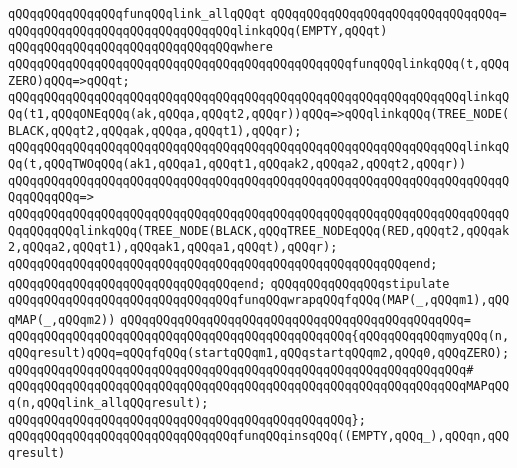 \verb|qQQqqQQqqQQqqQQqfunqQQqlink_allqQQqt|\newline
\verb|qQQqqQQqqQQqqQQqqQQqqQQqqQQqqQQq=|\newline
\verb|qQQqqQQqqQQqqQQqqQQqqQQqqQQqqQQqlinkqQQq(EMPTY,qQQqt)|\newline
\verb|qQQqqQQqqQQqqQQqqQQqqQQqqQQqqQQqwhere|\newline
\verb|qQQqqQQqqQQqqQQqqQQqqQQqqQQqqQQqqQQqqQQqqQQqqQQqfunqQQqlinkqQQq(t,qQQqZERO)qQQq=>qQQqt;|\newline
\verb|qQQqqQQqqQQqqQQqqQQqqQQqqQQqqQQqqQQqqQQqqQQqqQQqqQQqqQQqqQQqqQQqlinkqQQq(t1,qQQqONEqQQq(ak,qQQqa,qQQqt2,qQQqr))qQQq=>qQQqlinkqQQq(TREE_NODE(BLACK,qQQqt2,qQQqak,qQQqa,qQQqt1),qQQqr);|\newline
\newline
\verb|qQQqqQQqqQQqqQQqqQQqqQQqqQQqqQQqqQQqqQQqqQQqqQQqqQQqqQQqqQQqqQQqlinkqQQq(t,qQQqTWOqQQq(ak1,qQQqa1,qQQqt1,qQQqak2,qQQqa2,qQQqt2,qQQqr))|\newline
\verb|qQQqqQQqqQQqqQQqqQQqqQQqqQQqqQQqqQQqqQQqqQQqqQQqqQQqqQQqqQQqqQQqqQQqqQQqqQQqqQQq=>|\newline
\verb|qQQqqQQqqQQqqQQqqQQqqQQqqQQqqQQqqQQqqQQqqQQqqQQqqQQqqQQqqQQqqQQqqQQqqQQqqQQqqQQqlinkqQQq(TREE_NODE(BLACK,qQQqTREE_NODEqQQq(RED,qQQqt2,qQQqak2,qQQqa2,qQQqt1),qQQqak1,qQQqa1,qQQqt),qQQqr);|\newline
\verb|qQQqqQQqqQQqqQQqqQQqqQQqqQQqqQQqqQQqqQQqqQQqqQQqqQQqqQQqend;|\newline
\verb|qQQqqQQqqQQqqQQqqQQqqQQqqQQqqQQqend;|\newline
\newline
\verb|qQQqqQQqqQQqqQQqstipulate|\newline
\verb|qQQqqQQqqQQqqQQqqQQqqQQqqQQqqQQqfunqQQqwrapqQQqfqQQq(MAP(_,qQQqm1),qQQqMAP(_,qQQqm2))|\newline
\verb|qQQqqQQqqQQqqQQqqQQqqQQqqQQqqQQqqQQqqQQqqQQqqQQq=|\newline
\verb|qQQqqQQqqQQqqQQqqQQqqQQqqQQqqQQqqQQqqQQqqQQqqQQq{qQQqqQQqqQQqmyqQQq(n,qQQqresult)qQQq=qQQqfqQQq(startqQQqm1,qQQqstartqQQqm2,qQQq0,qQQqZERO);|\newline
\verb|qQQqqQQqqQQqqQQqqQQqqQQqqQQqqQQqqQQqqQQqqQQqqQQqqQQqqQQqqQQqqQQq#|\newline
\verb|qQQqqQQqqQQqqQQqqQQqqQQqqQQqqQQqqQQqqQQqqQQqqQQqqQQqqQQqqQQqqQQqMAPqQQq(n,qQQqlink_allqQQqresult);|\newline
\verb|qQQqqQQqqQQqqQQqqQQqqQQqqQQqqQQqqQQqqQQqqQQqqQQq};|\newline
\newline
\verb|qQQqqQQqqQQqqQQqqQQqqQQqqQQqqQQqfunqQQqinsqQQq((EMPTY,qQQq_),qQQqn,qQQqresult)|\newline
